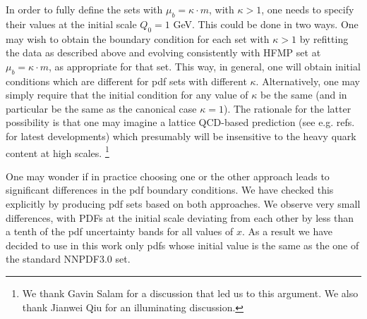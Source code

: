 \documentclass[letter,11pt]{article}
\def\mub{\mu_b}
\def\k{\kappa}
\begin{document}
In order to fully define the sets with $\mub=\k \cdot m$, with $\k>1$, one needs to specify their values at the initial scale $Q_0=1$ GeV. This could be done in two ways. One may wish to obtain the boundary condition for each set with $\k>1$ by refitting the data as described above and evolving consistently with HFMP set at $\mub=\k\cdot m$, as appropriate for that set. This way, in general, one will obtain initial conditions which are different for pdf sets with different $\k$. Alternatively, one may simply require that the initial condition for any value of $\k$ be the same (and in particular be the same as the canonical case $\k=1$). The rationale for the latter possibility is that one may imagine a lattice QCD-based prediction (see e.g. refs.~\cite{Alexandrou:2017huk,Orginos:2017kos,Nocera:2017war} for latest developments) which presumably will be insensitive to the heavy quark content at high scales.
%
\footnote{We thank Gavin Salam for a discussion that led us to this argument. We also thank Jianwei Qiu for an illuminating discussion.}
%


One may wonder if in practice choosing one or the other approach leads to significant differences in the pdf boundary conditions. We have checked this explicitly by producing pdf sets based on both approaches. We observe very small differences, with PDFs at the initial scale deviating from each other by less than a tenth of the pdf uncertainty bands for all values of $x$. As a result we have decided to use in this work only pdfs whose initial value is the same as the one of the standard NNPDF3.0 set.
\end{document}
